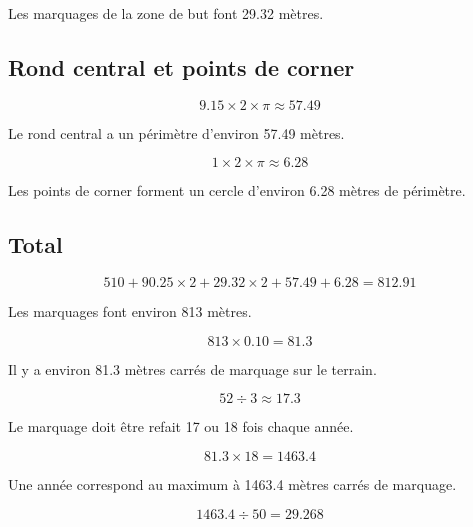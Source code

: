 \documentclass[12pt,a4paper]{article}
\begin{document}
Les marquages de la zone de but font \num{29.32} mètres.

\subsection*{Rond central et points de corner}

\begin{equation*}
	\num{9.15} \times 2 \times \pi \approx \num{57.49}
\end{equation*}

Le rond central a un périmètre d'environ \num{57.49} mètres.

\begin{equation*}
	\num{1} \times 2 \times \pi \approx \num{6.28}
\end{equation*}

Les points de corner forment un cercle d'environ \num{6.28} mètres de périmètre.

\subsection*{Total}

\begin{equation*}
	\num{510} + \num{90.25} \times 2 + \num{29.32} \times 2 + \num{57.49} + \num{6.28} = \num{812.91}
\end{equation*}

Les marquages font environ \num{813} mètres.


\begin{equation*}
813 \times \num{0.10} = \num{81.3}
\end{equation*}

Il y a environ \num{81.3} mètres carrés de marquage sur le terrain.

\begin{equation*}
52 \div 3 \approx \num{17.3}
\end{equation*}

Le marquage doit être refait 17 ou 18 fois chaque année.


\begin{equation*}
	\num{81.3} \times 18 = \num{1463.4}
\end{equation*}

Une année correspond au maximum à  \num{1463.4} mètres carrés de marquage.

\begin{equation*}
\num{1463.4} \div 50 = \num{29.268}
\end{equation*}
\end{document}
